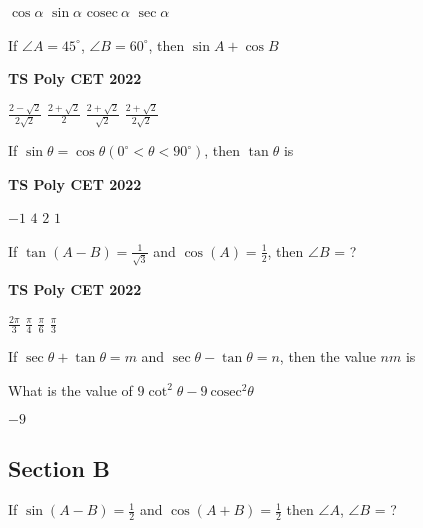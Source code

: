 \documentclass[11pt,paper=a4,answers]{exam}
\begin{document}
\begin{multicols}{2}
\begin{questions}
\begin{choices}
\choice $\displaystyle \cos \alpha$
\choice $\displaystyle \sin \alpha$
\choice $\displaystyle \textrm{cosec} \ \alpha$ 
\choice $\displaystyle \sec \alpha$
\end{choices}


\question If $\angle A=45^{\circ}$, $\angle B=60^{\circ}$, then $\sin A + \cos B$
\begin{flushright}
\small\textbf{TS Poly CET 2022}
\end{flushright}
\begin{choices}
\choice $\displaystyle \frac{2-\sqrt{2}}{2\sqrt{2}}$
\choice $\displaystyle \frac{2+\sqrt{2}}{{2}}$
\choice $\displaystyle \frac{2+\sqrt{2}}{\sqrt{2}}$
\choice $\displaystyle \frac{2+\sqrt{2}}{2\sqrt{2}}$
\end{choices}
\question 
If $\sin  \theta = \cos \theta \left(0^{\circ} < \theta < 90^{\circ}  \right)$, then $\tan \theta$ is
\begin{flushright}
\small\textbf{TS Poly CET 2022}
\end{flushright}


\begin{choices}
\choice $\displaystyle -1$ 
\choice $\displaystyle 4$ 
\choice $\displaystyle 2$ 
\choice $\displaystyle 1$  
\end{choices}
\columnbreak
\question If $\displaystyle \tan  \left(A-B \right) = \frac{1}{\sqrt{3}}$ and $\displaystyle \cos  \left(A \right) = \frac{1}{2}$, then $\angle B $ = ?
\begin{flushright}
\small\textbf{TS Poly CET 2022}
\end{flushright}

\begin{choices}
\choice $\displaystyle \frac{2 \pi }{3}$ 
\choice $\displaystyle \frac{\pi}{4}$
\choice $\displaystyle \frac{\pi}{6}$
 \choice $\displaystyle \frac{\pi}{3}$  
\end{choices}
\question If $\sec \theta + \tan  \theta = m$ and $\sec \theta - \tan  \theta = n$, then the value $nm$ is

\begin{choices}
\end{choices}
\question What is the value of $9 \cot^2 \theta -9\ \textrm{cosec}^2 \theta$


\begin{choices}
\choice $-9$
\end{choices}
\subsection*{Section B}
\question If $\displaystyle \sin \left(A-B \right) = \frac{1}{2}$ and $\displaystyle \cos \left( A+B \right) = \frac{1}{2}$ then $\angle A$, $\angle B$ = ?


\end{questions}
\end{multicols}
\end{document}
